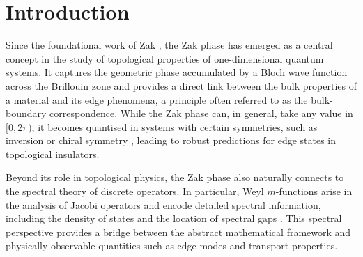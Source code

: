 \documentclass[a4paper,reqno,twoside]{amsart}
\numberwithin{equation}{section}
\theoremstyle{definition}
\newcommand{\<}{\ensuremath \leq}
\renewcommand{\>}{\ensuremath \geq}
\begin{document}


\section{Introduction}

Since the foundational work of Zak \cite{zak1989berry}, the Zak phase has emerged as a central concept in the study of topological properties of one-dimensional quantum systems. It captures the geometric phase accumulated by a Bloch wave function across the Brillouin zone and provides a direct link between the bulk properties of a material and its edge phenomena, a principle often referred to as the bulk-boundary correspondence. While the Zak phase can, in general, take any value in $[0,2\pi)$, it becomes quantised in systems with certain symmetries, such as inversion or chiral symmetry \cite{coutant2024surface, zak1989berry}, leading to robust predictions for edge states in topological insulators.

Beyond its role in topological physics, the Zak phase also naturally connects to the spectral theory of discrete operators. In particular, Weyl $m$-functions arise in the analysis of Jacobi operators and encode detailed spectral information, including the density of states and the location of spectral gaps \cite{Teschl1999-dz,damanik.fillman2022OneDimensional}. This spectral perspective provides a bridge between the abstract mathematical framework and physically observable quantities such as edge modes and transport properties.
\end{document}
